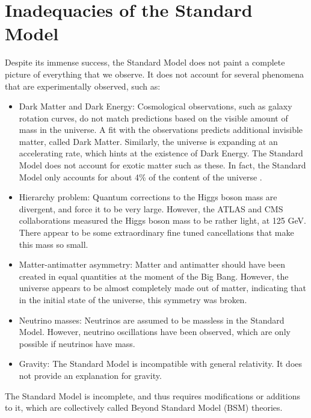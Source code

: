 \documentclass[12pt,a4paper,openright,twoside]{report}
\begin{document}
\section{Inadequacies of the Standard Model}
Despite its immense success, the Standard Model does not paint a complete picture of everything that we observe. It does not account for several phenomena that are experimentally observed, such as:
\begin{itemize}
\item Dark Matter and Dark Energy: Cosmological observations, such as galaxy rotation curves, do not match predictions based on the visible amount of mass in the universe. A fit with the observations predicts additional invisible matter, called Dark Matter\cite{DM_inc}. Similarly, the universe is expanding at an accelerating rate, which hints at the existence of Dark Energy\cite{DE}. The Standard Model does not account for exotic matter such as these. In fact, the Standard Model only accounts for about 4\% of the content of the universe \cite{Planck,DM_comp}.

\item Hierarchy problem\cite{hierarchy1,hierarchy2,hierarchy3,hierarchy4}: Quantum corrections to the Higgs boson mass are divergent, and force it to be very large. However, the ATLAS and CMS collaborations measured the Higgs boson mass to be rather light, at 125 GeV\cite{Higgs,Higgs2}. There appear to be some extraordinary fine tuned cancellations that make this mass so small.

\item Matter-antimatter asymmetry: Matter and antimatter should have been created in equal quantities at the moment of the Big Bang. However, the universe appears to be almost completely made out of matter, indicating that in the initial state of the universe, this symmetry was broken\cite{Baryon_Asymmetry}.

\item Neutrino masses: Neutrinos are assumed to be massless in the Standard Model. However, neutrino oscillations have been observed\cite{neutrino2}, which are only possible if neutrinos have mass\cite{neutrino_mass}.

\item Gravity: The Standard Model is incompatible with general relativity\cite{grav_inc}. It does not provide an explanation for gravity.

\end{itemize}

The Standard Model is incomplete, and thus requires modifications or additions to it, which are collectively called Beyond Standard Model (BSM) theories.
\end{document}
